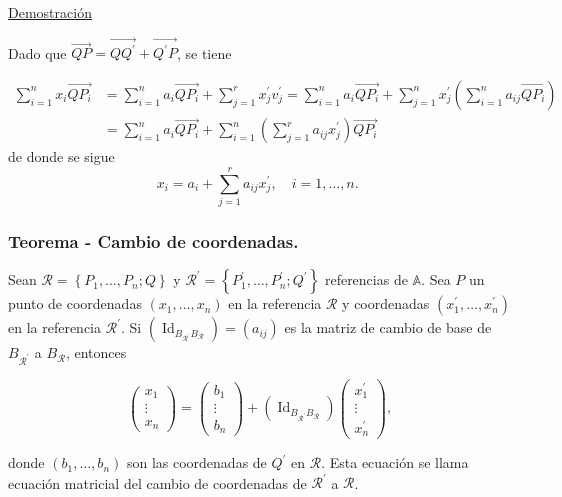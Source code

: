\documentclass[12pt, a4paper, ones, notitlepage, openany,titlepage]{article}
\newcommand{\demostracion}{\noindent\underline{Demostración}}
\begin{document}
\demostracion

\noindent Dado que $\overrightarrow{Q P}=\overrightarrow{Q Q^{\prime}}+\overrightarrow{Q^{\prime} P}$, se tiene

$$
\begin{aligned}
\sum_{i=1}^{n} x_{i} \overrightarrow{QP_i} & =\sum_{i=1}^{n} a_{i} \overrightarrow{QP_i}+\sum_{j=1}^{r} x_{j}^{\prime} v_{j}^{\prime}=\sum_{i=1}^{n} a_{i} \overrightarrow{QP_i}+\sum_{j=1}^{n} x_{j}^{\prime}\left(\sum_{i=1}^{n} a_{i j} \overrightarrow{QP_i}\right) \\
& =\sum_{i=1}^{n} a_{i} \overrightarrow{QP_i}+\sum_{i=1}^{n}\left(\sum_{j=1}^{r} a_{i j} x_{j}^{\prime}\right) \overrightarrow{QP_i}
\end{aligned}
$$
\noindent de donde se sigue
$$
x_{i}=a_{i}+\sum_{j=1}^{r} a_{i j} x_{j}^{\prime}, \quad i=1, \ldots, n \text {. }
$$

\subsubsection{Teorema - Cambio de coordenadas.}
Sean $\mathcal{R}=\left\{P_{1}, \ldots, P_{n} ; Q\right\}$ y $\mathcal{R}^{\prime}=\left\{P_{1}^{\prime}, \ldots, P_{n}^{\prime} ; Q^{\prime}\right\}$ referencias de $\mathbb{A}$. Sea $P$ un punto de coordenadas $\left(x_{1}, \ldots, x_{n}\right)$ en la referencia $\mathcal{R}$ y coordenadas $\left(x_{1}^{\prime}, \ldots, x_{n}^{\prime}\right)$ en la referencia $\mathcal{R}^{\prime}$. Si $\left(\operatorname{Id}_{B_{\mathcal{R}^{\prime}} B_{\mathcal{R}}}\right)=\left(a_{i j}\right)$ es la matriz de cambio de base de $B_{\mathcal{R}^{\prime}}$ a $B_{\mathcal{R}}$, entonces

$$
\left(\begin{array}{c}
x_{1} \\
\vdots \\
x_{n}
\end{array}\right)=\left(\begin{array}{c}
b_{1} \\
\vdots \\
b_{n}
\end{array}\right)+\left(\operatorname{Id}_{B_{\mathcal{R}^{\prime}} B_{\mathcal{R}}}\right)\left(\begin{array}{c}
x_{1}^{\prime} \\
\vdots \\
x_{n}^{\prime}
\end{array}\right),
$$

donde $\left(b_{1}, \ldots, b_{n}\right)$ son las coordenadas de $Q^{\prime}$ en $\mathcal{R}$. Esta ecuación se llama ecuación matricial del cambio de coordenadas de $\mathcal{R}^{\prime}$ a $\mathcal{R}$.
\end{document}
